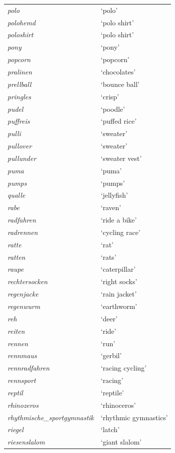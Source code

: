 \begin{longtable}{ll}
\textit{polo} & `polo' \\
\textit{polohemd} & `polo shirt' \\
\textit{poloshirt} & `polo shirt' \\
\textit{pony} & `pony' \\
\textit{popcorn} & `popcorn' \\
\textit{pralinen} & `chocolates' \\
\textit{prellball} & `bounce ball' \\
\textit{pringles} & `crisp' \\
\textit{pudel} & `poodle' \\
\textit{puffreis} & `puffed rice' \\
\textit{pulli} & `sweater' \\
\textit{pullover} & `sweater' \\
\textit{pullunder} & `sweater vest' \\
\textit{puma} & `puma' \\
\textit{pumps} & `pumps' \\
\textit{qualle} & `jellyfish' \\
\textit{rabe} & `raven' \\
\textit{radfahren} & `ride a bike' \\
\textit{radrennen} & `cycling race' \\
\textit{ratte} & `rat' \\
\textit{ratten} & `rats' \\
\textit{raupe} & `caterpillar' \\
\textit{rechtersocken} & `right socks' \\
\textit{regenjacke} & `rain jacket' \\
\textit{regenwurm} & `earthworm' \\
\textit{reh} & `deer' \\
\textit{reiten} & `ride' \\
\textit{rennen} & `run' \\
\textit{rennmaus} & `gerbil' \\
\textit{rennradfahren} & `racing cycling' \\
\textit{rennsport} & `racing' \\
\textit{reptil} & `reptile' \\
\textit{rhinozeros} & `rhinoceros' \\
\textit{rhythmische\_sportgymnastik} & `rhythmic gymnastics' \\
\textit{riegel} & `latch' \\
\textit{riesenslalom} & `giant slalom' \\

\end{longtable}
